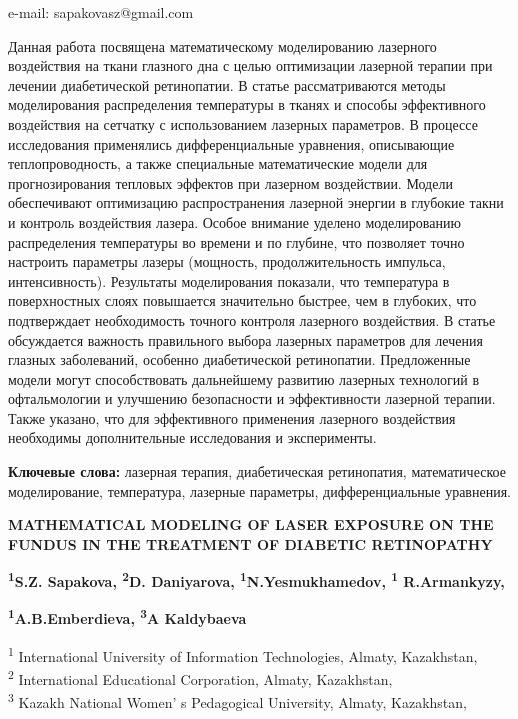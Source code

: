 e-mail: sapakovasz@gmail.com

Данная работа посвящена математическому моделированию лазерного
воздействия на ткани глазного дна с целью оптимизации лазерной терапии
при лечении диабетической ретинопатии. В статье рассматриваются методы
моделирования распределения температуры в тканях и способы эффективного
воздействия на сетчатку с использованием лазерных параметров. В процессе
исследования применялись дифференциальные уравнения, описывающие
теплопроводность, а также специальные математические модели для
прогнозирования тепловых эффектов при лазерном воздействии. Модели
обеспечивают оптимизацию распространения лазерной энергии в глубокие
такни и контроль воздействия лазера. Особое внимание уделено
моделированию распределения температуры во времени и по глубине, что
позволяет точно настроить параметры лазеры (мощность, продолжительность
импульса, интенсивность). Результаты моделирования показали, что
температура в поверхностных слоях повышается значительно быстрее, чем в
глубоких, что подтверждает необходимость точного контроля лазерного
воздействия. В статье обсуждается важность правильного выбора лазерных
параметров для лечения глазных заболеваний, особенно диабетической
ретинопатии. Предложенные модели могут способствовать дальнейшему
развитию лазерных технологий в офтальмологии и улучшению безопасности и
эффективности лазерной терапии. Также указано, что для эффективного
применения лазерного воздействия необходимы дополнительные исследования
и эксперименты.

{\bfseries Ключевые слова:} лазерная терапия, диабетическая ретинопатия,
математическое моделирование, температура, лазерные параметры,
дифференциальные уравнения.

{\bfseries MATHEMATICAL MODELING OF LASER EXPOSURE ON THE FUNDUS IN THE
TREATMENT OF DIABETIC RETINOPATHY}

{\bfseries \textsuperscript{1}S.Z. Sapakova\textsuperscript{\envelope },
\textsuperscript{2}D. Daniyarova, \textsuperscript{1}N.Yesmukhamedov,
\textsuperscript{1} R.Armankyzy,}

{\bfseries \textsuperscript{1}A.B.Emberdieva, \textsuperscript{3}A
Kaldybaeva}

\textsuperscript{1} International University of Information
Technologies, Almaty, Kazakhstan,\\
\textsuperscript{2} International Educational Corporation, Almaty,
Kazakhstan,\\
\textsuperscript{3} Kazakh National Women' s Pedagogical
University, Almaty, Kazakhstan,

